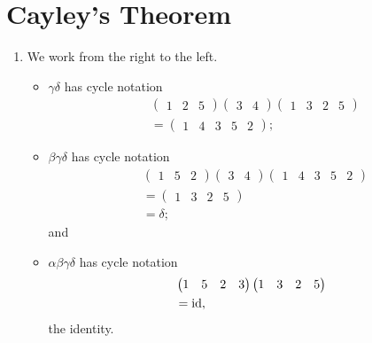 \section{Cayley's Theorem}
\begin{enumerate}
    \item We work from the right to the left.
    \begin{itemize}
        \item $\gamma \delta$ has cycle notation
        \begin{align*}
            &\begin{pmatrix}1 & 2 & 5\end{pmatrix}\begin{pmatrix}3 & 4\end{pmatrix}\begin{pmatrix}1 & 3 & 2 & 5\end{pmatrix}\\
            &= \begin{pmatrix}1 & 4 & 3 & 5 & 2\end{pmatrix};
        \end{align*}
        \item $\beta \gamma \delta$ has cycle notation
        \begin{align*}
            &\begin{pmatrix}1 & 5 & 2\end{pmatrix}\begin{pmatrix}3 & 4\end{pmatrix}\begin{pmatrix}1 & 4 & 3 & 5 & 2\end{pmatrix}\\
            &= \begin{pmatrix}1 & 3 & 2 & 5\end{pmatrix}\\
            &= \delta;
        \end{align*}
        and
        \item $\alpha \beta \gamma \delta$ has cycle notation 
        \begin{align*}
            &\begin{pmatrix}1 & 5 & 2 & 3\end{pmatrix}\begin{pmatrix}1 & 3 & 2 & 5\end{pmatrix}\\
            &= \mathrm{id},
        \end{align*}
        the identity.
    \end{itemize}


\end{enumerate}
